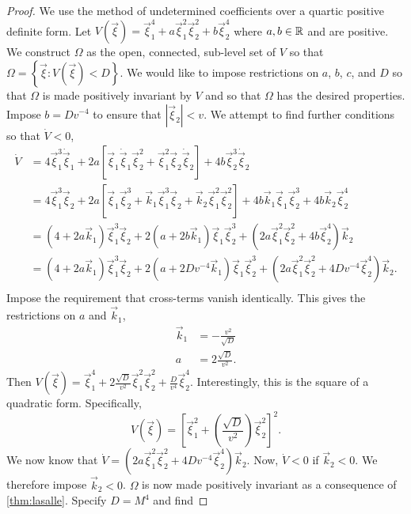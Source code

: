\begin{proof}
    We use the method of undetermined coefficients over a quartic positive definite form. Let $V(\vec{\xi}) = \vec{\xi}_1^4 + a\vec{\xi}_1^2\vec{\xi}_2^2 + b\vec{\xi}_2^4$ where $a, b\in\mathbb{R}$ and are positive. We construct $\Omega$ as the open, connected, sub-level set of $V$ so that $\Omega=\left\{\vec{\xi} : V(\vec{\xi}) < D\right\}.$ We would like to impose restrictions on $a$, $b$, $c$, and $D$ so that $\Omega$ is made positively invariant by $V$ and so that $\Omega$ has the desired properties. Impose $b = Dv^{-4}$ to ensure that $\left|\vec{\xi}_2\right| < v$. We attempt to find further conditions so that $\dot{V}<0$,
    \begin{align*}
        \dot{V} &=  4\vec{\xi}_1^3\dot{\vec{\xi}}_1 + 2a\left[\vec{\xi}_1\dot{\vec{\xi}}_1\vec{\xi}_2^2 + \vec{\xi}_1^2\vec{\xi}_2\dot{\vec{\xi}}_2\right] + 4b\vec{\xi}_2^3\dot{\vec{\xi}}_2\\
                    &=  4\vec{\xi}_1^3\vec{\xi}_2 + 2a\left[\vec{\xi}_1\vec{\xi}_2^3 + \vec{k}_1\vec{\xi}_1^3\vec{\xi}_2 + \vec{k}_2\vec{\xi}_1^2\vec{\xi}_2^2\right] + 4b\vec{k}_1\vec{\xi}_1\vec{\xi}_2^3 + 4b\vec{k}_2\vec{\xi}_2^4\\
                    &=  \left(4+2a\vec{k}_1\right)\vec{\xi}_1^3\vec{\xi}_2 + 2\left(a + 2b\vec{k}_1\right)\vec{\xi}_1\vec{\xi}_2^3 + \left(2a\vec{\xi}_1^2\vec{\xi}_2^2 + 4b\vec{\xi}_2^4\right)\vec{k}_2\\
                    &=  \left(4+2a\vec{k}_1\right)\vec{\xi}_1^3\vec{\xi}_2 + 2\left(a + 2Dv^{-4}\vec{k}_1\right)\vec{\xi}_1\vec{\xi}_2^3 + \left(2a\vec{\xi}_1^2\vec{\xi}_2^2 + 4Dv^{-4}\vec{\xi}_2^4\right)\vec{k}_2.\\
    \end{align*}
    Impose the requirement that cross-terms vanish identically. This gives the restrictions on $a$ and $\vec{k}_1$,
    \begin{align*}
        \vec{k}_1 &= -\frac{v^2}{\sqrt{D}}\\
        a &= 2\frac{\sqrt{D}}{v^2}.
    \end{align*}
    Then $V(\vec{\xi}) = \vec{\xi}_1^4 + 2\frac{\sqrt{D}}{v^2}\vec{\xi}_1^2\vec{\xi}_2^2 + \frac{D}{v^4}\vec{\xi}_2^4$. Interestingly, this is the square of a quadratic form. Specifically,
    $$
        V(\vec{\xi}) = \left[\vec{\xi}_1^2 + \left(\frac{\sqrt{D}}{v^2}\right)\vec{\xi}_2^2 \right]^2.
    $$ We now know that $\dot{V} = \left(2a\vec{\xi}_1^2\vec{\xi}_2^2 + 4Dv^{-4}\vec{\xi}_2^4\right)\vec{k}_2$. Now, $\dot{V} < 0$ if $\vec{k}_2 < 0$. We therefore impose $\vec{k}_2 < 0$. $\Omega$ is now made positively invariant as a consequence of \eqref{thm:lasalle}. Specify $D = M^4$ and find

\end{proof}
